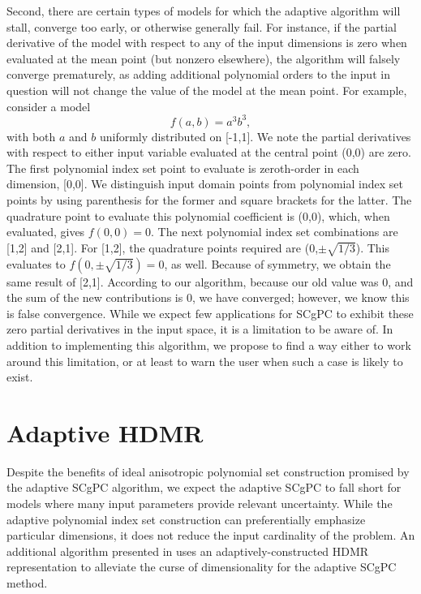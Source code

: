 Second, there are certain types of models for which the adaptive algorithm will stall, converge too early, or
otherwise generally fail.  For instance, if the partial derivative of the model with respect to any of the
input dimensions is zero when evaluated at the mean point (but nonzero elsewhere), the algorithm will falsely
converge prematurely, as adding additional polynomial orders to the input in question will not change the
value of the model at the mean point.  For example, consider a model
\begin{equation}
  f(a,b) = a^3b^3,
\end{equation}
with both $a$ and $b$ uniformly distributed on [-1,1].  We note the partial derivatives with respect to either
input variable evaluated at the central point (0,0) are zero.  The first polynomial index set point to
evaluate is zeroth-order in each dimension, [0,0].  We distinguish input domain points from polynomial index
set points by using parenthesis for the former and square brackets for the latter. The quadrature point to
evaluate this polynomial coefficient is (0,0), which, when evaluated, gives $f(0,0)=0$.  The next polynomial
index set combinations are [1,2] and [2,1].  For [1,2], the quadrature points required are
(0,$\pm\sqrt{1/3}$).  This evaluates to $f(0,\pm\sqrt{1/3})=0$, as well.  Because of symmetry, we obtain the
same result of [2,1].  According to our algorithm, because our old value was 0, and the sum of the new
contributions is 0, we have converged; however, we know this is false convergence.  While we expect few
applications for SCgPC to exhibit these zero partial derivatives in the input space, it is a limitation to be
aware of.  In addition to implementing this algorithm, we propose to find a way either to work around this
limitation, or at least to warn the user when such a case is likely to exist.


\section{Adaptive HDMR}
Despite the benefits of ideal anisotropic polynomial set construction promised by the adaptive SCgPC
algorithm, we expect the adaptive SCgPC to fall short for models where many input parameters provide relevant
uncertainty.  While the adaptive polynomial index set construction can preferentially emphasize particular
dimensions, it does not reduce the input cardinality of the problem.  An additional algorithm presented in
\cite{Ayres} uses an adaptively-constructed HDMR representation to alleviate the curse of dimensionality for
the adaptive SCgPC method.

